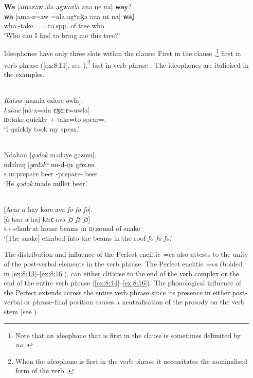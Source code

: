 \ea \label{ex:8:9}
\textbf{Wa}  [amazaw  ala  agwazla  ana  ne  na]  \textbf{way}?\\
\gll  \textbf{wa}      [ama-z=aw  =ala       agʷaɮa     ana     nɛ    na]     \textbf{waj}\\
      who   {\DEP}-take={\oneS}.{\IO}  =to   {spp. of tree}     {\DAT}    {\oneS}    {\PSP}    who\\
\glt  ‘Who can I find to bring me this tree?’
\z

Ideophones have only three slots within the clause: First in the clause ,\footnote{Note that an ideophone that is first in the clause is sometimes delimited by \textit{na} .} first in verb phrase (\ref{ex:8:11}, see ),\footnote{When the ideophone is first in the verb phrase it necessitates the nominalised form of the verb .} last in verb phrase . The ideophones are italicised in the examples.

\ea \label{ex:8:10}\\
\textit{Kal}\textit{ə}\textit{w}  [nazala   ezlere  əwla].\\
\gll  \textit{kaluw}       [nà-z=ala    ɛɮɛrɛ=uwla]\\
      {\textsc{id}:take quickly}    {\oneS}+{\PFV}-take=to   spear={\oneS}.{\POSS}\\
\glt  ‘I quickly took my spear.’
\z

\clearpage
\ea \label{ex:8:11}\\
Ndahan  [\textit{gədok}   mədəye  gəzom].\\
\gll  ndahaŋ  [\textit{gʊdɔkʷ}     mɪ-d-ijɛ       gʊzɔm ]\\
      \textsc{s}        {\textsc{id}:prepare beer}  {\NOM}{}-prepare-{\CL}   beer\\
\glt  ‘He \textit{gədok} made millet beer.’
\z

\ea \label{ex:8:12}\\
{}[Acar  a  hay  kəre  ava  \textit{fo fo fo}].\\
\gll  {}[à-tsar              a  haj        kɪrɛ       ava  \textit{fɔ fɔ fɔ}]\\
      \textsc{s}+{\PFV}-climb  at   house  beams  in          \textsc{id}:sound of snake\\
\glt  ‘[The snake] climbed into the beams in the roof \textit{fo fo fo}.’
\z

The distribution and influence of the Perfect enclitic \textit{=va}  also attests to the unity of the post-verbal elements in the verb phrase. The Perfect enclitic \textit{=va}  (bolded in \ref{ex:8:13}--\ref{ex:8:16}), can either cliticise to the end of the verb complex  or the end of the entire verb phrase (\ref{ex:8:14}--\ref{ex:8:16}). The phonological influence of the Perfect extends across the entire verb phrase since its presence in either post-verbal or phrase-final position causes a neutralisation of the prosody on the verb stem (see ).

